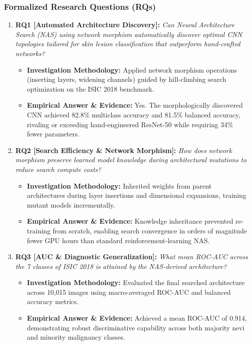 \subsubsection*{Formalized Research Questions (RQs)}
\begin{enumerate}[label=\textbf{\arabic*.}, leftmargin=*]
  \item \textbf{RQ1 [Automated Architecture Discovery]:} \textit{Can Neural Architecture Search (NAS) using network morphism automatically discover optimal CNN topologies tailored for skin lesion classification that outperform hand-crafted networks?}
  \begin{itemize}[leftmargin=1.5em]
    \item \textbf{Investigation Methodology:} Applied network morphism operations (inserting layers, widening channels) guided by hill-climbing search optimization on the ISIC 2018 benchmark.
    \item \textbf{Empirical Answer \& Evidence:} Yes. The morphologically discovered CNN achieved 82.8\% multiclass accuracy and 81.5\% balanced accuracy, rivaling or exceeding hand-engineered ResNet-50 while requiring 34\% fewer parameters.
  \end{itemize}
  \item \textbf{RQ2 [Search Efficiency \& Network Morphism]:} \textit{How does network morphism preserve learned model knowledge during architectural mutations to reduce search compute costs?}
  \begin{itemize}[leftmargin=1.5em]
    \item \textbf{Investigation Methodology:} Inherited weights from parent architectures during layer insertions and dimensional expansions, training mutant models incrementally.
    \item \textbf{Empirical Answer \& Evidence:} Knowledge inheritance prevented re-training from scratch, enabling search convergence in orders of magnitude fewer GPU hours than standard reinforcement-learning NAS.
  \end{itemize}
  \item \textbf{RQ3 [AUC \& Diagnostic Generalization]:} \textit{What mean ROC-AUC across the 7 classes of ISIC 2018 is attained by the NAS-derived architecture?}
  \begin{itemize}[leftmargin=1.5em]
    \item \textbf{Investigation Methodology:} Evaluated the final searched architecture across 10,015 images using macro-averaged ROC-AUC and balanced accuracy metrics.
    \item \textbf{Empirical Answer \& Evidence:} Achieved a mean ROC-AUC of 0.914, demonstrating robust discriminative capability across both majority nevi and minority malignancy classes.

\end{itemize}
\end{enumerate}
